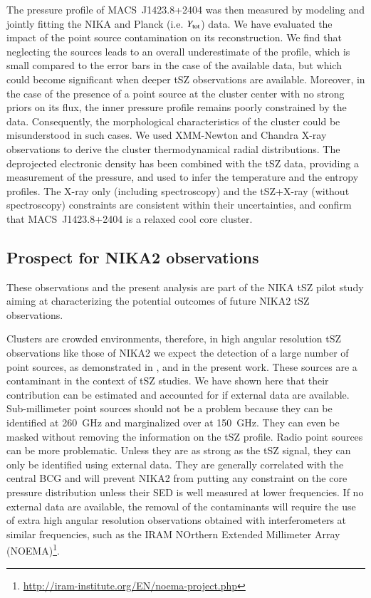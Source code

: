 \documentclass[twocolumn,traditabstract]{aa}
\begin{document}
The pressure profile of \mbox{MACS~J1423.8+2404} was then measured by modeling and jointly fitting the NIKA and Planck (i.e. $Y_{\rm tot}$) data. We have evaluated the impact of the point source contamination on its reconstruction. We find that neglecting the sources leads to an overall underestimate of the profile, which is small compared to the error bars in the case of the available data, but which could become significant when deeper tSZ observations are available. Moreover, in the case of the presence of a point source at the cluster center with no strong priors on its flux, the inner pressure profile remains poorly constrained by the data. Consequently, the morphological characteristics of the cluster could be misunderstood in such cases. We used XMM-Newton and Chandra X-ray observations to derive the cluster thermodynamical radial distributions. The deprojected electronic density has been combined with the tSZ data, providing a measurement of the pressure, and used to infer the temperature and the entropy profiles. The X-ray only (including spectroscopy) and the tSZ+X-ray (without spectroscopy) constraints are consistent within their uncertainties, and confirm that \mbox{MACS~J1423.8+2404} is a relaxed cool core cluster.

\subsection{Prospect for NIKA2 observations}
These observations and the present analysis are part of the NIKA tSZ pilot study aiming at characterizing the potential outcomes of future NIKA2 tSZ observations.

Clusters are crowded environments, therefore, in high angular resolution tSZ observations like those of NIKA2 we expect the detection of a large number of point sources, as demonstrated in \cite{adam2013}, \cite{adam2014} and in the present work. These sources are a contaminant in the context of tSZ studies. We have shown here that their contribution can be estimated and accounted for if external data are available. Sub-millimeter point sources should not be a problem because they can be identified at 260~GHz and marginalized over at 150~GHz. They can even be masked without removing the information on the tSZ profile. Radio point sources can be more problematic. Unless they are as strong as the tSZ signal, they can only be identified using external data. They are generally correlated with the central BCG and will prevent  NIKA2 from putting any constraint on the core pressure distribution unless their SED is well measured at lower frequencies. If no external data are available, the removal of the contaminants will require the use of extra high angular resolution observations obtained with interferometers at similar frequencies, such as the IRAM NOrthern Extended Millimeter Array (NOEMA)\footnote{\url{http://iram-institute.org/EN/noema-project.php}}. 
\end{document}
